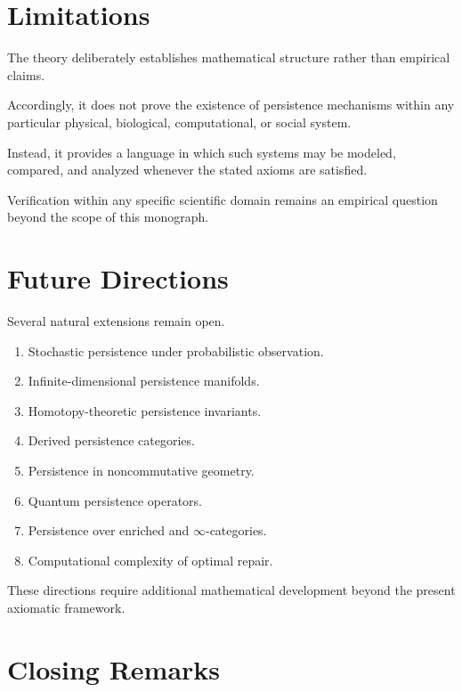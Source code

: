 \documentclass[11pt]{book}
\numberwithin{equation}{chapter}
\theoremstyle{definition}
\theoremstyle{plain}
\begin{document}
\section{Limitations}

The theory deliberately establishes mathematical structure rather than
empirical claims.

Accordingly, it does not prove the existence of persistence mechanisms
within any particular physical, biological, computational, or social
system.

Instead, it provides a language in which such systems may be modeled,
compared, and analyzed whenever the stated axioms are satisfied.

Verification within any specific scientific domain remains an empirical
question beyond the scope of this monograph.

\section{Future Directions}

Several natural extensions remain open.

\begin{enumerate}

\item Stochastic persistence under probabilistic observation.

\item Infinite-dimensional persistence manifolds.

\item Homotopy-theoretic persistence invariants.

\item Derived persistence categories.

\item Persistence in noncommutative geometry.

\item Quantum persistence operators.

\item Persistence over enriched and $\infty$-categories.

\item Computational complexity of optimal repair.

\end{enumerate}

These directions require additional mathematical development beyond the
present axiomatic framework.

\section{Closing Remarks}
\end{document}
